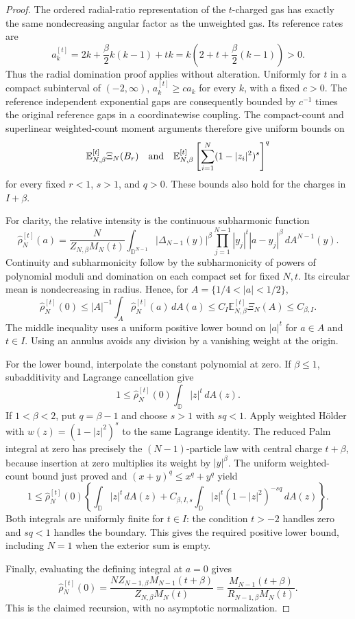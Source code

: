 \documentclass[11pt,a4paper]{article}
\numberwithin{equation}{section}
\theoremstyle{definition}
\theoremstyle{remark}
\newcommand{\D}{\mathbb D}
\begin{document}
\begin{proof}
The ordered radial-ratio representation of the $t$-charged gas has
exactly the same nondecreasing angular factor as the unweighted gas.
Its reference rates are
\[
 a_k^{[t]}=2k+\frac\beta2k(k-1)+tk
         =k\left(2+t+\frac\beta2(k-1)\right)>0.
\]
Thus the radial domination proof applies without alteration.
Uniformly for $t$ in a compact subinterval of $(-2,\infty)$,
$a_k^{[t]}\ge c a_k$ for every $k$, with a fixed $c>0$.
The reference independent exponential gaps are consequently bounded
by $c^{-1}$ times the original reference gaps in a coordinatewise
coupling.  The compact-count and superlinear weighted-count moment
arguments therefore give uniform bounds on
\[
 \mathbb E_{N,\beta}^{[t]}\Xi_N(B_r)
 \quad\hbox{and}\quad
 \mathbb E_{N,\beta}^{[t]}
       \left[\sum_{i=1}^N(1-|z_i|^2)^s\right]^q
\]
for every fixed $r<1$, $s>1$, and $q>0$.  These bounds also hold
for the charges in $I+\beta$.

For clarity, the relative intensity is the continuous subharmonic
function
\[
 \widehat\rho_N^{[t]}(a)=
 \frac{N}{Z_{N,\beta}M_N(t)}
 \int_{\D^{N-1}} |\Delta_{N-1}(y)|^\beta
        \prod_{j=1}^{N-1}|y_j|^t|a-y_j|^\beta\,dA^{N-1}(y).
\]
Continuity and subharmonicity follow by the subharmonicity of powers
of polynomial moduli and domination on each compact set for fixed
$N,t$.  Its circular mean is nondecreasing in radius.  Hence, for
$A=\{1/4<|a|<1/2\}$,
\[
 \widehat\rho_N^{[t]}(0)
 \le |A|^{-1}\int_A\widehat\rho_N^{[t]}(a)\,dA(a)
 \le C_I\mathbb E_{N,\beta}^{[t]}\Xi_N(A)\le C_{\beta,I}.
\]
The middle inequality uses a uniform positive lower bound on $|a|^t$
for $a\in A$ and $t\in I$.  Using an annulus avoids any division
by a vanishing weight at the origin.

For the lower bound, interpolate the constant polynomial at zero.
If $\beta\le1$, subadditivity and Lagrange cancellation give
\[
 1\le\widehat\rho_N^{[t]}(0)\int_\D |z|^t\,dA(z).
\]
If $1<\beta<2$, put $q=\beta-1$ and choose $s>1$ with $sq<1$.
Apply weighted H\"older with $w(z)=(1-|z|^2)^s$ to the same
Lagrange identity.  The reduced Palm integral at zero has precisely
the $(N-1)$-particle law with central charge $t+\beta$, because
insertion at zero multiplies its weight by $|y|^\beta$.
The uniform weighted-count bound just proved and
$(x+y)^q\le x^q+y^q$ yield
\[
 1\le\widehat\rho_N^{[t]}(0)
 \left\{\int_\D |z|^t\,dA(z)
  +C_{\beta,I,s}\int_\D |z|^t(1-|z|^2)^{-sq}\,dA(z)\right\}.
\]
Both integrals are uniformly finite for $t\in I$: the condition
$t>-2$ handles zero and $sq<1$ handles the boundary.  This gives
the required positive lower bound, including $N=1$ when the exterior
sum is empty.

Finally, evaluating the defining integral at $a=0$ gives
\[
 \widehat\rho_N^{[t]}(0)
 =\frac{N Z_{N-1,\beta}M_{N-1}(t+\beta)}
        {Z_{N,\beta}M_N(t)}
 =\frac{M_{N-1}(t+\beta)}{R_{N-1,\beta}M_N(t)}.
\]
This is the claimed recursion, with no asymptotic normalization.
\end{proof}
\end{document}
